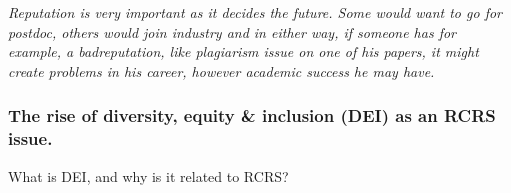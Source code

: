 \documentclass{beamer}
\begin{document}
\begin{frame}




\end{frame}

\begin{frame}


{\it Reputation is very important as it decides the future.  Some would want to go for postdoc, others would join industry and in either way, if someone has for example, a badreputation, like plagiarism issue on one of his papers, it might create problems in his career, however academic success he may have.}







\end{frame}

\begin{frame}

\frametitle{The rise of diversity, equity \& inclusion (DEI) as an RCRS issue.}

What is DEI, and why is it related to RCRS?

\end{frame}
\end{document}
